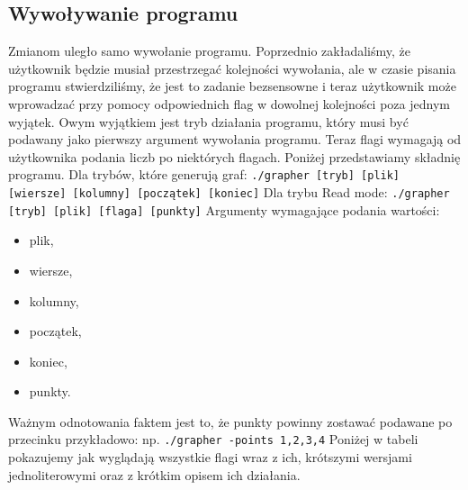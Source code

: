 \documentclass[10pt, a4paper]{report}
\begin{document}
    \subsection{Wywoływanie programu}
    Zmianom uległo samo wywołanie programu. Poprzednio zakładaliśmy, że użytkownik będzie musiał przestrzegać kolejności wywołania, ale w czasie
    pisania programu stwierdziliśmy, że jest to zadanie bezsensowne i teraz użytkownik może wprowadzać przy pomocy odpowiednich flag w dowolnej kolejności poza jednym wyjątek. Owym wyjątkiem jest tryb działania
    programu, który musi być podawany jako pierwszy argument wywołania programu.
    Teraz flagi wymagają od użytkownika podania liczb po niektórych flagach. Poniżej przedstawiamy składnię programu.
    \newline Dla trybów, które generują graf:
    \newline\newline \texttt{./grapher [tryb] [plik] [wiersze] [kolumny] [początek] [koniec]}
    \newline\newline Dla trybu Read mode:
    \newline\newline \texttt{./grapher [tryb] [plik] [flaga] [punkty]}
    \newline\newline Argumenty wymagające podania wartości:
    \begin{itemize}
        \item plik,
        \item wiersze,
        \item kolumny,
        \item początek,
        \item koniec,
        \item punkty.
    \end{itemize}
    Ważnym odnotowania faktem jest to, że punkty powinny zostawać podawane po przecinku przykładowo:
    \newline\newline np.
    \newline \texttt{./grapher -points 1,2,3,4}
    \newline\newline Poniżej w tabeli pokazujemy jak wyglądają wszystkie flagi wraz z ich, krótszymi wersjami jednoliterowymi oraz z krótkim opisem ich działania.
    \newline
\end{document}
